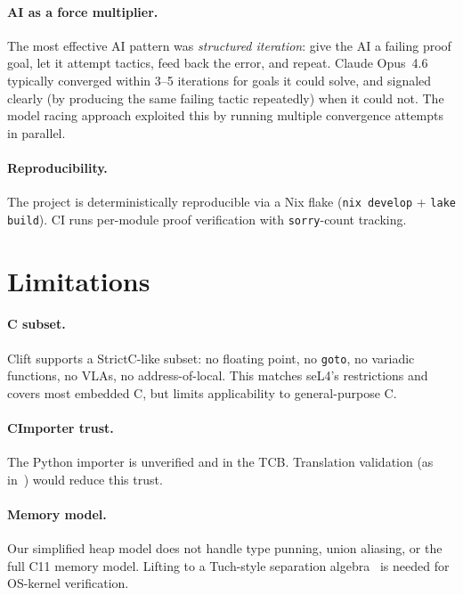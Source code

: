 \documentclass[sigconf,nonacm,screen]{acmart}
\begin{document}
\paragraph{AI as a force multiplier.}
The most effective AI pattern was \emph{structured iteration}:
give the AI a failing proof goal, let it attempt tactics, feed
back the error, and repeat. Claude Opus~4.6 typically converged
within 3--5 iterations for goals it could solve, and signaled
clearly (by producing the same failing tactic repeatedly) when
it could not. The model racing approach exploited this by running multiple
convergence attempts in parallel.

\paragraph{Reproducibility.}
The project is deterministically reproducible via a Nix flake
(\texttt{nix develop} + \texttt{lake build}). CI runs per-module
proof verification with \texttt{sorry}-count tracking.

\section{Limitations}

\paragraph{C subset.} Clift supports a StrictC-like subset: no
floating point, no \texttt{goto}, no variadic functions, no VLAs, no
address-of-local. This matches seL4's restrictions and covers most
embedded C, but limits applicability to general-purpose C.

\paragraph{CImporter trust.} The Python importer is unverified and in
the TCB\@. Translation validation
(as in~\cite{sewell2013translation}) would reduce this trust.

\paragraph{Memory model.} Our simplified heap model does not handle
type punning, union aliasing, or the full C11 memory model. Lifting to
a Tuch-style separation algebra~\cite{tuch2009types} is needed for
OS-kernel verification.
\end{document}
